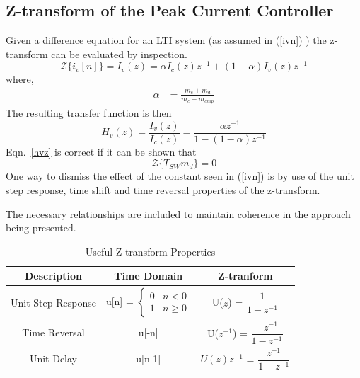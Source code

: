 \documentclass[conference]{IEEEtran}
\begin{document}
\subsection{Z-transform of the Peak Current Controller}
Given a difference equation for an LTI system (as assumed in (\ref{ivn}) ) the z-transform can be evaluated by inspection.  
\begin{equation}
\mathcal{Z} \{ i_v[n] \} = I_v (z) =  \alpha I_c(z) z^{-1} + ( 1 - \alpha ) I_v (z) z^{-1}  \label{ivz}
\end{equation}
where,
\begin{align}
\alpha &= \frac{m_c + m_d} {m_c + m_{cmp}}
\end{align}
The resulting transfer function is then
\begin{equation}
H_v(z) = \frac {I_v(z)} {I_c(z)} = \frac {\alpha z^{-1}} {1 - (1-\alpha) z^{-1}}  \label{hvz}
\end{equation}
Eqn.~\ref{hvz} is correct if it can be shown that
\begin{equation}
 \mathcal{Z} \{ T_{SW} m_d \} = 0 \label{zconst}
\end{equation}
One way to dismiss the effect of the constant seen in (\ref{ivn}) is by use of the unit step response, time shift and time reversal properties of the z-transform.

The necessary relationships are included to maintain coherence in the approach being presented.

\begin{table}[H]
	\caption{Useful Z-transform Properties}
	\begin{center}
		\begin{tabular}{|c|c|c|}
			\hline
			\textbf{Description}& \textbf{Time Domain}& \textbf{Z-tranform}\\
			\hline
			Unit Step Response & 
			u[n] =
			$ \begin{cases} 
				0 & n < 0 \\
				1 & n \geq 0 
			\end{cases} $ 
			 & U($ \mathit{z} $) = $\dfrac{1}{1-z^{-1}}$ \\
			\hline
			
			
			Time Reversal& u[-n]& U($ \mathit{z^{-1}} $) = $\dfrac{-z^{-1}}{1-z^{-1}}$  \\
			\hline
			Unit Delay & u[n-1] & $U( \mathit{z} )\mathit{z^{-1}}$ = $\dfrac{z^{-1}}{1-z^{-1}}$  \\
			\hline

		\end{tabular}
		\label{tabun}
	\end{center}
\end{table}
\end{document}
